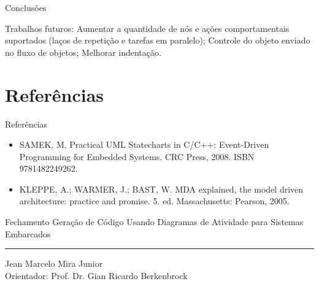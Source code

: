 \documentclass[handout,aspectratio = 169]{beamer}
\begin{document}
\begin{frame}{Conclusões}

    \begin{outline}
        \1 Trabalhos futuros:
        \2 Aumentar a quantidade de nós e ações comportamentais suportados (laços de repetição e tarefas em paralelo);
        \2 Controle do objeto enviado no fluxo de objetos;
        \2 Melhorar indentação.
    \end{outline}
\end{frame}



\section{Referências}
\begin{frame}[t]{Referências}
    \begin{itemize}
        \item SAMEK, M. Practical UML Statecharts in C/C++: Event-Driven Programming for Embedded Systems. CRC Press, 2008. ISBN 9781482249262.
        \item KLEPPE, A.; WARMER, J.; BAST, W. MDA explained, the model driven architecture: practice and promise. 5. ed. Massachusetts: Pearson, 2005.
    \end{itemize}
\end{frame}

\begin{frame}{Fechamento}
    \centering
    Geração de Código Usando Diagramas de Atividade para Sistemas Embarcados
   \par\noindent\rule{\textwidth}{0.5pt}
    Jean Marcelo Mira Junior\\
    Orientador: Prof. Dr. Gian Ricardo Berkenbrock

\end{frame}
\end{document}
